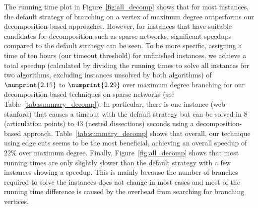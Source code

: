 \documentclass[a4paper,UKenglish,cleveref, autoref, thm-restate]{lipics-v2021}
\begin{document}
The running time plot in Figure~\ref{fig:all_decomp} shows that for most instances, the default strategy of branching on a
vertex of maximum degree outperforms our decomposition-based approaches.
However, for instances that have suitable candidates for decomposition such as
sparse networks, significant speedups compared to the default strategy can be
seen. To be more specific, assigning a time of ten hours (our timeout threshold) for unfinished
instances, we achieve a total speedup (calculated by dividing the running times
to solve all instances for two algorithms, excluding instances unsolved by both
algorithms) of $\numprint{2.15}$ to $\numprint{2.29}$ over maximum degree branching for our
decomposition-based techniques on sparse networks (see
Table~\ref{tab:summary_decomp}). In particular, there is one instance (web-stanford) that causes a timeout with the
default strategy but can be solved in $8$ (articulation points) to $43$ (nested
dissections) seconds using a decomposition-based approach. Table~\ref{tab:summary_decomp} shows that overall, our
technique using edge cuts seems to be the most beneficial, achieving an overall
speedup of $22\%$ over maximum degree.
Finally, Figure~\ref{fig:all_decomp} shows that most running
times are only slightly slower than the default strategy with a few instances
showing a speedup. This is mainly because
the number of branches required to solve the instances does not change in most
cases and most of the running time
difference is caused by the overhead from
searching for branching vertices.%
\end{document}

